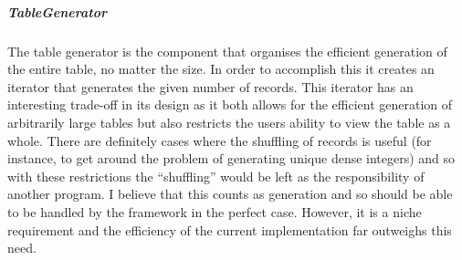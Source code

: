 \subparagraph{TableGenerator} The table generator is the component that
organises the efficient generation of the entire table, no matter the size. In
order to accomplish this it creates an iterator that generates the given number
of records. This iterator has an interesting trade-off in its design as it both allows
for the efficient generation of arbitrarily large tables but also restricts the
users ability to view the table as a whole. There are definitely cases
where the shuffling of records is useful (for instance, to get around the problem
of generating unique dense integers) and so with these restrictions the
``shuffling'' would be left as the responsibility of another program. I believe
that this counts as generation and so should be able to be handled by the
framework in the perfect case. However, it is a niche requirement and the efficiency of the current
implementation far outweighs this need.
